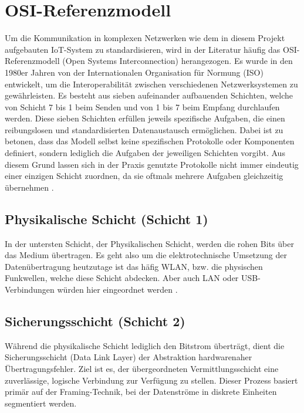 \section{OSI-Referenzmodell}


Um die Kommunikation in komplexen Netzwerken wie dem in diesem Projekt aufgebauten IoT-System zu standardisieren, wird in der Literatur häufig das \ac{OSI}-Referenzmodell (Open Systems Interconnection) herangezogen. Es wurde in den 1980er Jahren von der Internationalen Organisation für Normung (ISO) entwickelt, um die Interoperabilität zwischen verschiedenen Netzwerksystemen zu gewährleisten. Es besteht aus sieben aufeinander aufbauenden Schichten, welche von Schicht 7 bis 1 beim Senden und von 1 bis 7 beim Empfang durchlaufen werden. Diese sieben Schichten erfüllen jeweils spezifische Aufgaben, die einen reibungslosen und standardisierten Datenaustausch ermöglichen. Dabei ist zu betonen, dass das Modell selbst keine spezifischen Protokolle oder Komponenten definiert, sondern lediglich die Aufgaben der jeweiligen Schichten vorgibt. Aus diesem Grund lassen sich in der Praxis genutzte Protokolle nicht immer eindeutig einer einzigen Schicht zuordnen, da sie oftmals mehrere Aufgaben gleichzeitig übernehmen . %

\subsection{Physikalische Schicht (Schicht 1)}

In der untersten Schicht, der Physikalischen Schicht, werden die rohen Bits über das Medium übertragen. Es geht also um die elektrotechnische Umsetzung der Datenübertragung heutzutage ist das häfig WLAN, bzw. die physischen Funkwellen, welche diese Schicht abdecken. Aber auch LAN oder USB-Verbindungen würden hier eingeordnet werden .

\subsection{Sicherungsschicht (Schicht 2)}

Während die physikalische Schicht lediglich den Bitstrom überträgt, dient die Sicherungsschicht (Data Link Layer) der Abstraktion hardwarenaher Übertragungsfehler. Ziel ist es, der übergeordneten Vermittlungsschicht eine zuverlässige, logische Verbindung zur Verfügung zu stellen. Dieser Prozess basiert primär auf der Framing-Technik, bei der Datenströme in diskrete Einheiten segmentiert werden.


